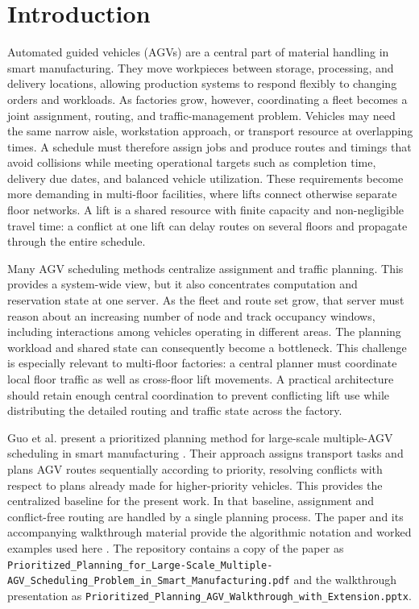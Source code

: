 \documentclass[11pt]{article}
\begin{document}
\section{Introduction}

Automated guided vehicles (AGVs) are a central part of material handling in
smart manufacturing. They move workpieces between storage, processing, and
delivery locations, allowing production systems to respond flexibly to
changing orders and workloads. As factories grow, however, coordinating a
fleet becomes a joint assignment, routing, and traffic-management problem.
Vehicles may need the same narrow aisle, workstation approach, or transport
resource at overlapping times. A schedule must therefore assign jobs and
produce routes and timings that avoid collisions while meeting operational
targets such as completion time, delivery due dates, and balanced vehicle
utilization. These requirements become more demanding in multi-floor
facilities, where lifts connect otherwise separate floor networks. A lift is
a shared resource with finite capacity and non-negligible travel time: a
conflict at one lift can delay routes on several floors and propagate through
the entire schedule.

Many AGV scheduling methods centralize assignment and traffic planning. This
provides a system-wide view, but it also concentrates computation and
reservation state at one server. As the fleet and route set grow, that server
must reason about an increasing number of node and track occupancy windows,
including interactions among vehicles operating in different areas. The
planning workload and shared state can consequently become a bottleneck.
This challenge is especially relevant to multi-floor factories: a central
planner must coordinate local floor traffic as well as cross-floor lift
movements. A practical architecture should retain enough central coordination
to prevent conflicting lift use while distributing the detailed routing and
traffic state across the factory.

Guo et al. present a prioritized planning method for large-scale multiple-AGV
scheduling in smart manufacturing \cite{guo2024}. Their approach assigns
transport tasks and plans AGV routes sequentially according to priority,
resolving conflicts with respect to plans already made for higher-priority
vehicles. This provides the centralized baseline for the present work. In
that baseline, assignment and conflict-free routing are handled by a single
planning process. The paper and its accompanying walkthrough material provide
the algorithmic notation and worked examples used here
\cite{guo2024,walkthrough}. The repository contains a copy of the paper as
\texttt{Prioritized\_Planning\_for\_Large-Scale\_Multiple-AGV\_Scheduling\_Problem\_in\_Smart\_Manufacturing.pdf}
and the walkthrough presentation as
\texttt{Prioritized\_Planning\_AGV\_Walkthrough\_with\_Extension.pptx}.
\end{document}
